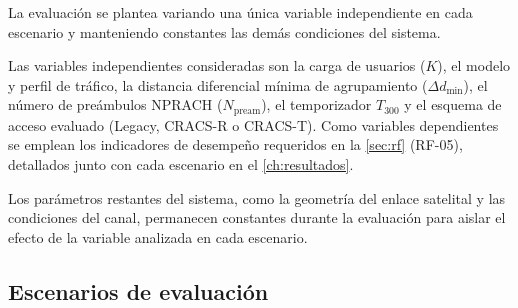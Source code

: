 La evaluación se plantea variando una única variable independiente en cada escenario y manteniendo constantes las demás condiciones del sistema.

Las variables independientes consideradas son la carga de usuarios ($K$), el modelo y perfil de tráfico, la distancia diferencial mínima de agrupamiento ($\Delta d_{\min}$), el número de preámbulos NPRACH ($N_{\text{pream}}$), el temporizador $T_{300}$ y el esquema de acceso evaluado (Legacy, CRACS-R o CRACS-T). Como variables dependientes se emplean los indicadores de desempeño requeridos en la \cref{sec:rf} (RF-05), detallados junto con cada escenario en el \cref{ch:resultados}.

Los parámetros restantes del sistema, como la geometría del enlace satelital y las condiciones del canal, permanecen constantes durante la evaluación para aislar el efecto de la variable analizada en cada escenario.

\subsection{Escenarios de evaluación}
\label{sec:escenarios}

